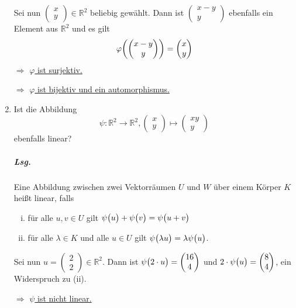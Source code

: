 \documentclass{scrreprt}
\begin{document}
\begin{enumerate}[(1)]
  Sei nun $\begin{pmatrix} x \\ y \end{pmatrix} \in \mathbb{R}^2$ beliebig
  gewählt.
  Dann ist $\begin{pmatrix} x - y \\ y \end{pmatrix}$ ebenfalls ein Element
  aus $\mathbb{R}^2$ und es gilt
  \[
    \varphi\qty(\begin{pmatrix} x - y \\ y \end{pmatrix}) =
    \begin{pmatrix} x \\ y \end{pmatrix}
  \]
  $\Rightarrow$ \underline{$\varphi$ ist surjektiv.}

  $\Rightarrow$ \underline{$\varphi$ ist bijektiv und ein automorphismus.}

\newpage
\item Ist die Abbildung
  \[
    \psi \colon \mathbb{R}^2 \to \mathbb{R}^2,
    \begin{pmatrix}
      x \\
      y
    \end{pmatrix}
    \mapsto
    \begin{pmatrix}
      xy \\
      y
    \end{pmatrix}
  \]
  ebenfalls linear?

  \subparagraph{Lsg.} Eine Abbildung zwischen zwei Vektorräumen
  $U$ und $W$ über einem Körper $K$ heißt linear, falls
  \begin{enumerate}[(i)]
  \item für alle  $u, v \in U$ gilt
    $\psi\qty\big(u) + \psi\qty\big(v) = \psi\qty\big(u + v)$

  \item für alle $\lambda \in K$ und alle $u \in U$ gilt
    $\psi\qty\big(\lambda u) = \lambda \psi\qty\big(u)$.
  \end{enumerate}

  Sei nun $u = \begin{pmatrix} 2 \\ 2 \end{pmatrix} \in \mathbb{R}^2$.
  Dann ist $\psi\qty\big(2 \cdot u) = \begin{pmatrix} 16 \\ 4 \end{pmatrix}$
  und $2 \cdot \psi\qty\big(u) = \begin{pmatrix} 8 \\ 4 \end{pmatrix}$,
  ein Widerspruch zu (ii).

  $\Rightarrow$ \underline{$\psi$ ist nicht linear.}
\end{enumerate}
\end{document}
